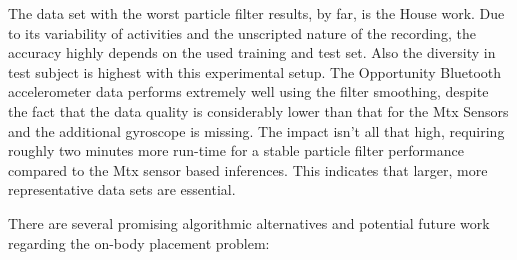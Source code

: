 The data set with the worst particle filter results, by far, is the
House work. Due to its variability of activities and the unscripted
nature of the recording, the accuracy highly depends on the used
training and test set. Also the diversity in test subject is highest with this experimental setup.  
The Opportunity
Bluetooth accelerometer data performs extremely well using the filter
smoothing, despite the fact that the data quality is considerably lower than that for the
Mtx Sensors and the additional gyroscope is missing. 
The impact isn't all that high, requiring roughly two minutes more run-time
for a stable particle filter performance compared to the Mtx sensor 
based inferences. This indicates that larger, more representative
data sets are essential.
 
There are several promising algorithmic alternatives and potential future work
regarding the on-body placement problem:

